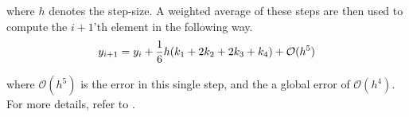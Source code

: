 \documentclass[10pt,showpacs,preprintnumbers,amsmath,amssymb,nofootinbib,aps,prl,twocolumn,groupedaddress,superscriptaddress,showkeys]{revtex4-1}
\begin{document}
    where $h$ denotes the step-size. A weighted average of these steps are then used to compute the $i+1$'th element in the following way.
    \begin{equation}
      y_{i+1} = y_i + \frac{1}{6}h\qty(k_1 + 2k_2 + 2k_3 + k_4) + \mathcal O(h^5)
    \end{equation}

    where $\mathcal O(h^5)$ is the error in this single step, and the a global error of $\mathcal O (h^4)$. For more details, refer to \textcite[p.~250]{compphys_lecnotes}.

\begin{figure}[h!tb]
  \centering
   \\
   \\

\end{figure}
\end{document}
